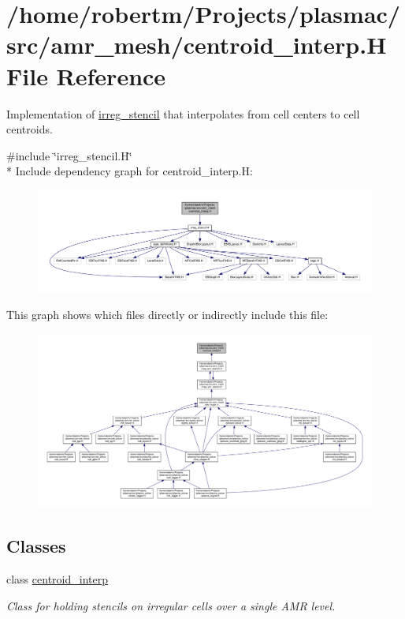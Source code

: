 \hypertarget{centroid__interp_8H}{}\section{/home/robertm/\+Projects/plasmac/src/amr\+\_\+mesh/centroid\+\_\+interp.H File Reference}
\label{centroid__interp_8H}


Implementation of \hyperlink{classirreg__stencil}{irreg\+\_\+stencil} that interpolates from cell centers to cell centroids.  


{\ttfamily \#include \char`\"{}irreg\+\_\+stencil.\+H\char`\"{}}\\*
Include dependency graph for centroid\+\_\+interp.\+H\+:\nopagebreak
\begin{figure}[H]
\begin{center}
\leavevmode
\includegraphics[width=350pt]{centroid__interp_8H__incl}
\end{center}
\end{figure}
This graph shows which files directly or indirectly include this file\+:\nopagebreak
\begin{figure}[H]
\begin{center}
\leavevmode
\includegraphics[width=350pt]{centroid__interp_8H__dep__incl}
\end{center}
\end{figure}
\subsection*{Classes}
\begin{DoxyCompactItemize}
\item 
class \hyperlink{classcentroid__interp}{centroid\+\_\+interp}
\begin{DoxyCompactList}\small\item\em Class for holding stencils on irregular cells over a single A\+MR level. \end{DoxyCompactList}\end{DoxyCompactItemize}


